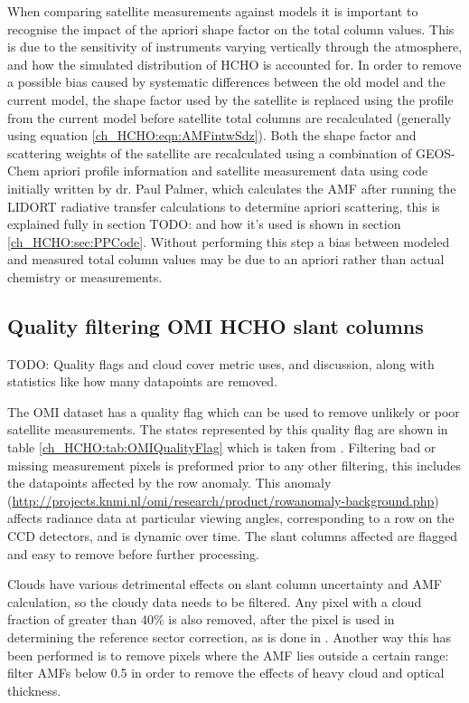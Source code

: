     When comparing satellite measurements against models it is important to recognise the impact of the apriori shape factor on the total column values.
    This is due to the sensitivity of instruments varying vertically through the atmosphere, and how the simulated distribution of HCHO is accounted for.
    In order to remove a possible bias caused by systematic differences between the old model and the current model, the shape factor used by the satellite is replaced using the profile from the current model before satellite total columns are recalculated (generally using equation \ref{ch_HCHO:eqn:AMFintwSdz}).
    Both the shape factor and scattering weights of the satellite are recalculated using a combination of GEOS-Chem apriori profile information and satellite measurement data using code initially written by dr. Paul Palmer, which calculates the AMF after running the LIDORT radiative transfer calculations to determine apriori scattering, this is explained fully in section TODO: and how it's used is shown in section \ref{ch_HCHO:sec:PPCode}.
    Without performing this step a bias between modeled and measured total column values may be due to an apriori rather than actual chemistry or measurements.

  \subsection{Quality filtering OMI HCHO slant columns}
    \label{ch_HCHO:sec:OMIFiltering}
    TODO: Quality flags and cloud cover metric uses, and discussion, along with statistics like how many datapoints are removed.
    
    The OMI dataset has a quality flag which can be used to remove unlikely or poor satellite measurements.
    The states represented by this quality flag are shown in table \ref{ch_HCHO:tab:OMIQualityFlag} which is taken from \citet{Kurosu2014}.
    Filtering bad or missing measurement pixels is preformed prior to any other filtering, this includes the datapoints affected by the row anomaly.
    This anomaly (\url{http://projects.knmi.nl/omi/research/product/rowanomaly-background.php}) affects radiance data at particular viewing angles, corresponding to a row on the CCD detectors, and is dynamic over time.
    The slant columns affected are flagged and easy to remove before further processing.
    
    Clouds have various detrimental effects on slant column uncertainty and AMF calculation, so the cloudy data needs to be filtered.
    Any pixel with a cloud fraction of greater than 40\% is also removed, after the pixel is used in determining the reference sector correction, as is done in \citet{Abad2015, DeSmedt2015}.
    Another way this has been performed is to remove pixels where the AMF lies outside a certain range: \citet{Martin2002} filter AMFs below 0.5 in order to remove the effects of heavy cloud and optical thickness.
     
